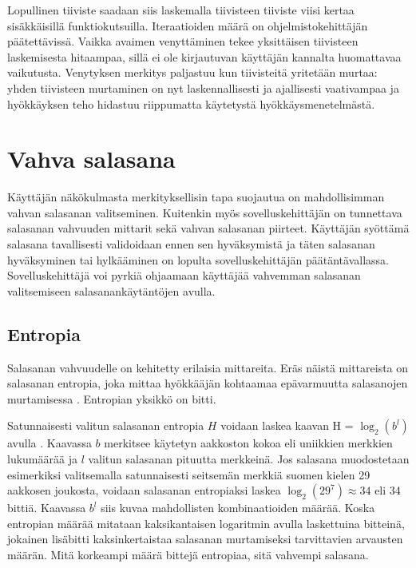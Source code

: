 Lopullinen tiiviste saadaan siis laskemalla tiivisteen tiiviste viisi kertaa sisäkkäisillä funktiokutsuilla. Iteraatioiden määrä on ohjelmistokehittäjän päätettävissä. Vaikka avaimen venyttäminen tekee yksittäisen tiivisteen laskemisesta hitaampaa, sillä ei ole kirjautuvan käyttäjän kannalta huomattavaa vaikutusta. Venytyksen merkitys paljastuu kun tiivisteitä yritetään murtaa: yhden tiivisteen murtaminen on nyt laskennallisesti ja ajallisesti vaativampaa ja hyökkäyksen teho hidastuu riippumatta käytetystä hyökkäysmenetelmästä.

\section{Vahva salasana\label{sec:vahva_salasana}}

Käyttäjän näkökulmasta merkityksellisin tapa suojautua on mahdollisimman vahvan salasanan valitseminen. Kuitenkin myös sovelluskehittäjän on tunnettava salasanan vahvuuden mittarit sekä vahvan salasanan piirteet. Käyttäjän syöttämä salasana tavallisesti validoidaan ennen sen hyväksymistä ja täten salasanan hyväksyminen tai hylkääminen on lopulta sovelluskehittäjän päätäntävallassa. Sovelluskehittäjä voi pyrkiä ohjaamaan käyttäjää vahvemman salasanan valitsemiseen salasanankäytäntöjen avulla.

\subsection{Entropia\label{subsec:entropia}}

Salasanan vahvuudelle on kehitetty erilaisia mittareita. Eräs näistä mittareista on salasanan entropia, joka mittaa hyökkääjän kohtaamaa epävarmuutta salasanojen murtamisessa \citep[s. 9]{burr_electronic_2013}. Entropian yksikkö on bitti.

Satunnaisesti valitun salasanan entropia $H$ voidaan laskea kaavan H = $\log_{2}(b^l)$ avulla \citep[s. 104]{burr_electronic_2013}. Kaavassa $b$ merkitsee käytetyn aakkoston kokoa eli uniikkien merkkien lukumäärää ja $l$ valitun salasanan pituutta merkkeinä. Jos salasana muodostetaan esimerkiksi valitsemalla satunnaisesti seitsemän merkkiä suomen kielen 29 aakkosen joukosta, voidaan salasanan entropiaksi laskea $\log_{2}(29^{7}) \approx 34$ eli 34 bittiä. Kaavassa $b^l$ siis kuvaa mahdollisten kombinaatioiden määrää. Koska entropian määrää mitataan kaksikantaisen logaritmin avulla laskettuina bitteinä, jokainen lisäbitti kaksinkertaistaa salasanan murtamiseksi tarvittavien arvausten määrän. Mitä korkeampi määrä bittejä entropiaa, sitä vahvempi salasana.

